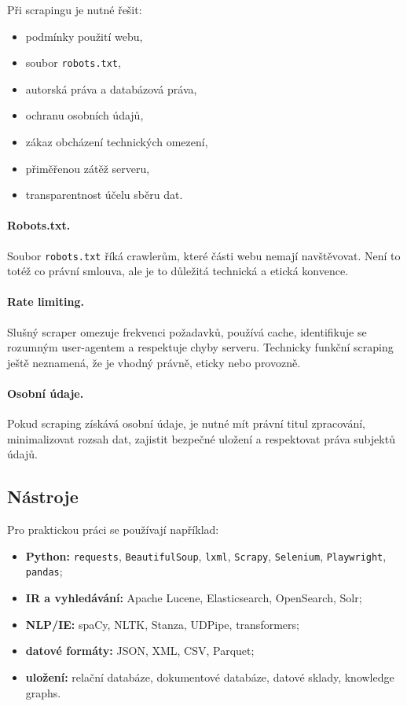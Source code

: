 Při scrapingu je nutné řešit:
\begin{itemize}
    \item podmínky použití webu,
    \item soubor \texttt{robots.txt},
    \item autorská práva a databázová práva,
    \item ochranu osobních údajů,
    \item zákaz obcházení technických omezení,
    \item přiměřenou zátěž serveru,
    \item transparentnost účelu sběru dat.
\end{itemize}

\paragraph{Robots.txt.}
Soubor \texttt{robots.txt} říká crawlerům, které části webu nemají navštěvovat. Není to totéž co právní
smlouva, ale je to důležitá technická a etická konvence.

\paragraph{Rate limiting.}
Slušný scraper omezuje frekvenci požadavků, používá cache, identifikuje se rozumným user-agentem a respektuje
chyby serveru. Technicky funkční scraping ještě neznamená, že je vhodný právně, eticky nebo provozně.

\paragraph{Osobní údaje.}
Pokud scraping získává osobní údaje, je nutné mít právní titul zpracování, minimalizovat rozsah dat,
zajistit bezpečné uložení a respektovat práva subjektů údajů.

\subsection{Nástroje}

Pro praktickou práci se používají například:
\begin{itemize}
    \item \textbf{Python:} \texttt{requests}, \texttt{BeautifulSoup}, \texttt{lxml}, \texttt{Scrapy},
    \texttt{Selenium}, \texttt{Playwright}, \texttt{pandas};
    \item \textbf{IR a vyhledávání:} Apache Lucene, Elasticsearch, OpenSearch, Solr;
    \item \textbf{NLP/IE:} spaCy, NLTK, Stanza, UDPipe, transformers;
    \item \textbf{datové formáty:} JSON, XML, CSV, Parquet;
    \item \textbf{uložení:} relační databáze, dokumentové databáze, datové sklady, knowledge graphs.
\end{itemize}

